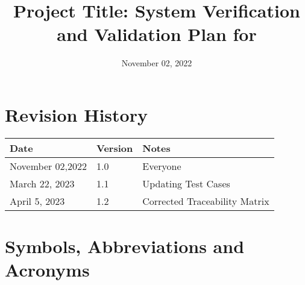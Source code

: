 \documentclass[12pt]{article}
\begin{document}
\title{Project Title: System Verification and Validation Plan for \progname{}} 
\author{\authname}

\date{November 02, 2022}

	
\maketitle


\newpage

\tableofcontents

\listoftables

\newpage

\section{Revision History}

\begin{tabularx}{\textwidth}{p{5cm}p{2cm}X}
\toprule {\bf Date} & {\bf Version} & {\bf Notes}\\
\midrule
November 02,2022 & 1.0 & Everyone\\
March 22, 2023 & 1.1 & Updating Test Cases\\
April 5, 2023 & 1.2 & Corrected Traceability Matrix\\
\bottomrule
\end{tabularx}

\newpage

\section{Symbols, Abbreviations and Acronyms}
\end{document}
